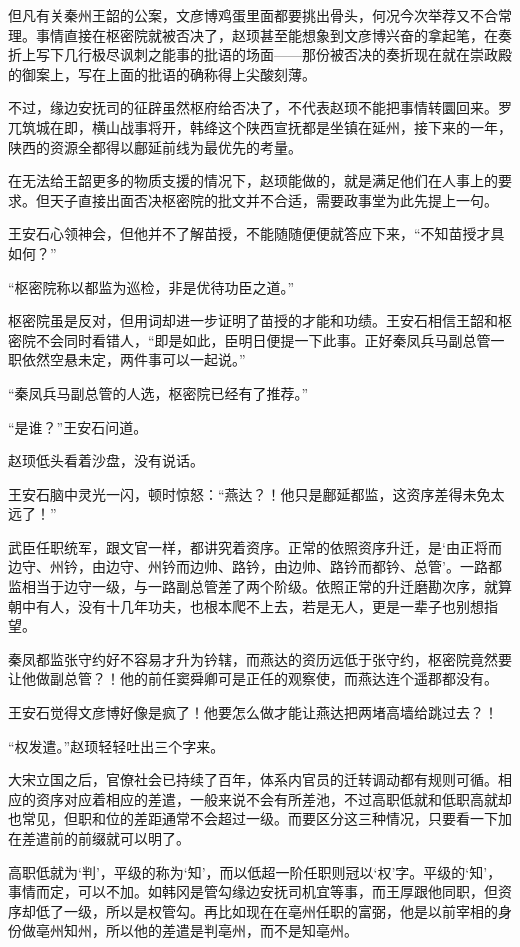 但凡有关秦州王韶的公案，文彦博鸡蛋里面都要挑出骨头，何况今次举荐又不合常理。事情直接在枢密院就被否决了，赵顼甚至能想象到文彦博兴奋的拿起笔，在奏折上写下几行极尽讽刺之能事的批语的场面——那份被否决的奏折现在就在崇政殿的御案上，写在上面的批语的确称得上尖酸刻薄。

不过，缘边安抚司的征辟虽然枢府给否决了，不代表赵顼不能把事情转圜回来。罗兀筑城在即，横山战事将开，韩绛这个陕西宣抚都是坐镇在延州，接下来的一年，陕西的资源全都得以鄜延前线为最优先的考量。

在无法给王韶更多的物质支援的情况下，赵顼能做的，就是满足他们在人事上的要求。但天子直接出面否决枢密院的批文并不合适，需要政事堂为此先提上一句。

王安石心领神会，但他并不了解苗授，不能随随便便就答应下来，“不知苗授才具如何？”

“枢密院称以都监为巡检，非是优待功臣之道。”

枢密院虽是反对，但用词却进一步证明了苗授的才能和功绩。王安石相信王韶和枢密院不会同时看错人，“即是如此，臣明日便提一下此事。正好秦凤兵马副总管一职依然空悬未定，两件事可以一起说。”

“秦凤兵马副总管的人选，枢密院已经有了推荐。”

“是谁？”王安石问道。

赵顼低头看着沙盘，没有说话。

王安石脑中灵光一闪，顿时惊怒：“燕达？！他只是鄜延都监，这资序差得未免太远了！”

武臣任职统军，跟文官一样，都讲究着资序。正常的依照资序升迁，是‘由正将而边守、州钤，由边守、州钤而边帅、路钤，由边帅、路钤而都钤、总管’。一路都监相当于边守一级，与一路副总管差了两个阶级。依照正常的升迁磨勘次序，就算朝中有人，没有十几年功夫，也根本爬不上去，若是无人，更是一辈子也别想指望。

秦凤都监张守约好不容易才升为钤辖，而燕达的资历远低于张守约，枢密院竟然要让他做副总管？！他的前任窦舜卿可是正任的观察使，而燕达连个遥郡都没有。

王安石觉得文彦博好像是疯了！他要怎么做才能让燕达把两堵高墙给跳过去？！

“权发遣。”赵顼轻轻吐出三个字来。

大宋立国之后，官僚社会已持续了百年，体系内官员的迁转调动都有规则可循。相应的资序对应着相应的差遣，一般来说不会有所差池，不过高职低就和低职高就却也常见，但职和位的差距通常不会超过一级。而要区分这三种情况，只要看一下加在差遣前的前缀就可以明了。

高职低就为‘判’，平级的称为‘知’，而以低超一阶任职则冠以‘权’字。平级的‘知’，事情而定，可以不加。如韩冈是管勾缘边安抚司机宜等事，而王厚跟他同职，但资序却低了一级，所以是权管勾。再比如现在在亳州任职的富弼，他是以前宰相的身份做亳州知州，所以他的差遣是判亳州，而不是知亳州。


